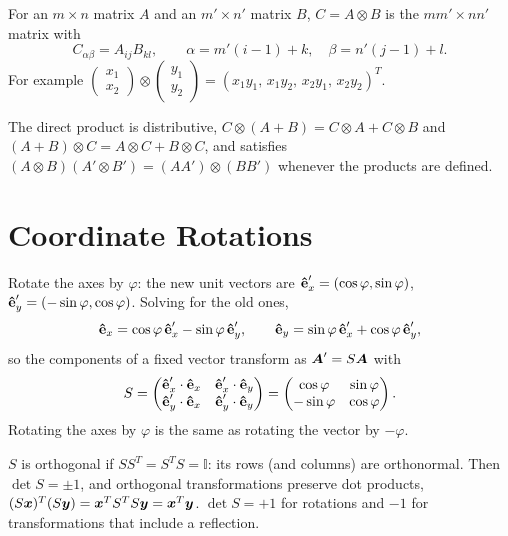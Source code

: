 \begin{definition}
For an $m\times n$ matrix $A$ and an $m'\times n'$ matrix $B$, $C = A\otimes B$ is the $mm'\times nn'$ matrix with
\[
    C_{\alpha\beta} = A_{ij}B_{kl},\qquad \alpha = m'(i-1)+k,\quad \beta = n'(j-1)+l .
\]
For example $\begin{pmatrix}x_1\\x_2\end{pmatrix}\otimes\begin{pmatrix}y_1\\y_2\end{pmatrix} = (x_1y_1,\,x_1y_2,\,x_2y_1,\,x_2y_2)^T$.
\end{definition}
The direct product is distributive, $C\otimes(A+B) = C\otimes A + C\otimes B$ and $(A+B)\otimes C = A\otimes C + B\otimes C$, and satisfies $(A\otimes B)(A'\otimes B') = (AA')\otimes(BB')$ whenever the products are defined.

\section{Coordinate Rotations}

Rotate the axes by $\varphi$: the new unit vectors are $\boldsymbol{\hat{\textbf{e}}}'_x = (\cos\varphi,\sin\varphi)$, $\boldsymbol{\hat{\textbf{e}}}'_y = (-\sin\varphi,\cos\varphi)$. Solving for the old ones,
\[
    \boldsymbol{\hat{\textbf{e}}}_x = \cos\varphi\,\boldsymbol{\hat{\textbf{e}}}'_x - \sin\varphi\,\boldsymbol{\hat{\textbf{e}}}'_y,\qquad
    \boldsymbol{\hat{\textbf{e}}}_y = \sin\varphi\,\boldsymbol{\hat{\textbf{e}}}'_x + \cos\varphi\,\boldsymbol{\hat{\textbf{e}}}'_y,
\]
so the components of a fixed vector transform as $\vect{A}' = S\vect{A}$ with
\[
    S = \begin{pmatrix} \boldsymbol{\hat{\textbf{e}}}'_x\cdot\boldsymbol{\hat{\textbf{e}}}_x & \boldsymbol{\hat{\textbf{e}}}'_x\cdot\boldsymbol{\hat{\textbf{e}}}_y \\ \boldsymbol{\hat{\textbf{e}}}'_y\cdot\boldsymbol{\hat{\textbf{e}}}_x & \boldsymbol{\hat{\textbf{e}}}'_y\cdot\boldsymbol{\hat{\textbf{e}}}_y\end{pmatrix}
    = \begin{pmatrix}\cos\varphi & \sin\varphi\\ -\sin\varphi & \cos\varphi\end{pmatrix}.
\]
Rotating the axes by $\varphi$ is the same as rotating the vector by $-\varphi$.

\begin{definition}
$S$ is orthogonal if $SS^T = S^TS = \mathbb{I}$: its rows (and columns) are orthonormal. Then $\det S = \pm1$, and orthogonal transformations preserve dot products, $(S\bm{x})^T(S\bm{y}) = \bm{x}^TS^TS\bm{y} = \bm{x}^T\bm{y}$. $\det S=+1$ for rotations and $-1$ for transformations that include a reflection.
\end{definition}

